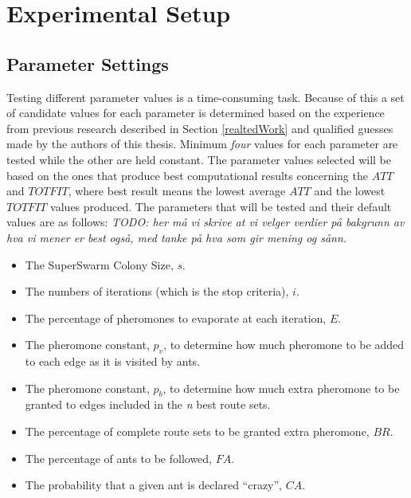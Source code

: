 \section{Experimental Setup}

 
\subsection{Parameter Settings}
\label{subsec:parameterSettings_setup}

Testing different parameter values is a time-consuming task. Because of this a set of candidate values for each parameter is determined based on the experience from previous research described in Section \vref{realtedWork} and qualified guesses made by the authors of this thesis. Minimum \textit{four} values for each parameter are tested while the other are held constant. The parameter values selected will be based on the ones that produce best computational results concerning the $ATT$ and $TOTFIT$, where best result means the lowest average $ATT$ and the lowest $TOTFIT$ values produced. The parameters that will be tested and their default values are as follows:
\emph{\color{blue} TODO: her må vi skrive at vi velger verdier på bakgrunn av hva vi mener er best også, med tanke på hva som gir mening og sånn. }  

\begin{itemize}
\item The SuperSwarm Colony Size, $s$. 
\item The numbers of iterations (which is the stop criteria), $i$.
\item The percentage of pheromones to evaporate at each iteration, $E$.
\item The pheromone constant, $p_v$, to determine how much pheromone to be added to each edge as it is visited by ants.
\item The pheromone constant, $p_b$, to determine how much extra pheromone to be granted to edges included in the \textit{n} best route sets.
\item The percentage of complete route sets to be granted extra pheromone, $BR$.
\item The percentage of ants to be followed, $FA$.
\item The probability that a given ant is declared ``crazy'', $CA$.
\end{itemize}

